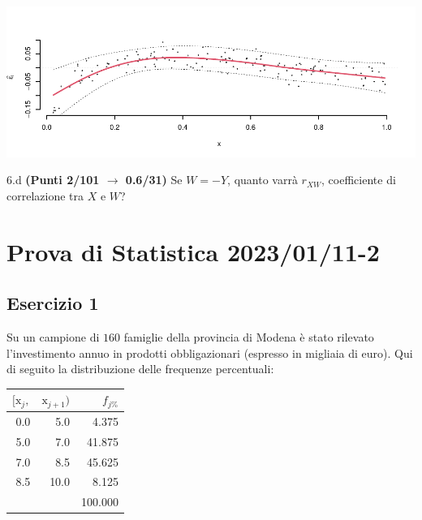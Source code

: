 \documentclass[
  11pt,
]{book}
\theoremstyle{mytheoremstyle}
\theoremstyle{mydefstyle}
\newenvironment{sol}
  {
  \begin{tcolorbox}[enhanced,breakable,arc=0.1mm,boxrule=1pt,colback=white,colframe=iblue,
  title=\bf \fontfamily{lmss}\selectfont \hspace{.5 cm} Soluzione,drop fuzzy shadow]

}{
\end{tcolorbox}
  }
\begin{document}
\begin{sol}

\begin{center}\includegraphics{Esami_passati_con_soluzioni_files/figure-latex/2023-5,-1} \end{center}

\end{sol}

6.d \textbf{(Punti 2/101 \(\rightarrow\) 0.6/31)} Se \(W=- Y\), quanto varrà \(r_{XW}\), coefficiente di correlazione tra \(X\) e \(W\)?

\section{Prova di Statistica 2023/01/11-2}\label{prova-di-statistica-20230111-2}

\subsection{Esercizio 1}\label{esercizio-1-20}

Su un campione di \(160\) famiglie della provincia di Modena è stato rilevato l'investimento annuo in prodotti obbligazionari (espresso in migliaia di euro). Qui di seguito la distribuzione delle frequenze percentuali:

\begin{sol}

\begin{table}[H]
\centering
\begin{tabular}{rrr}
\toprule
$[\text{x}_j,$ & $\text{x}_{j+1})$ & $f_{j\%}$\\
\midrule
0.0 & 5.0 & 4.375\\
5.0 & 7.0 & 41.875\\
7.0 & 8.5 & 45.625\\
8.5 & 10.0 & 8.125\\
 &  & 100.000\\
\bottomrule
\end{tabular}
\end{table}

\end{sol}
\end{document}
